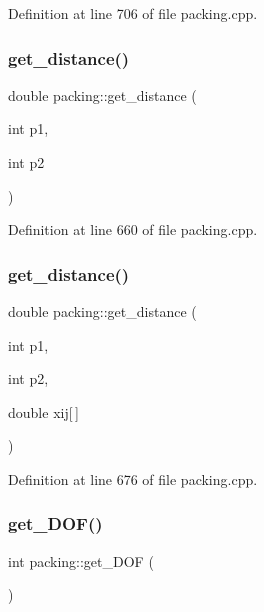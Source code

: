 Definition at line 706 of file packing.\+cpp.

\mbox{\label{classpacking_acf25ed42e0fdfc8334d9c6468e5c34e1}} 
\subsubsection{\texorpdfstring{get\+\_\+distance()}{get\_distance()}\hspace{0.1cm}{\footnotesize\ttfamily [1/2]}}
{\footnotesize\ttfamily double packing\+::get\+\_\+distance (\begin{DoxyParamCaption}\item[{int}]{p1,  }\item[{int}]{p2 }\end{DoxyParamCaption})}



Definition at line 660 of file packing.\+cpp.

\mbox{\label{classpacking_a79d854d4f45683e8a11652ce90676a90}} 
\subsubsection{\texorpdfstring{get\+\_\+distance()}{get\_distance()}\hspace{0.1cm}{\footnotesize\ttfamily [2/2]}}
{\footnotesize\ttfamily double packing\+::get\+\_\+distance (\begin{DoxyParamCaption}\item[{int}]{p1,  }\item[{int}]{p2,  }\item[{double}]{xij\mbox{[}$\,$\mbox{]} }\end{DoxyParamCaption})}



Definition at line 676 of file packing.\+cpp.

\mbox{\label{classpacking_a0b60c2368d6b16389edfdb81bd0f45b7}} 
\subsubsection{\texorpdfstring{get\+\_\+\+D\+O\+F()}{get\_DOF()}}
{\footnotesize\ttfamily int packing\+::get\+\_\+\+D\+OF (\begin{DoxyParamCaption}{ }\end{DoxyParamCaption})\hspace{0.3cm}{\ttfamily [inline]}}



